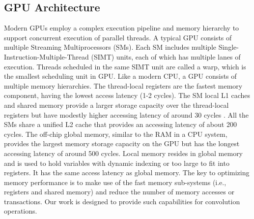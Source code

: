 \subsection{GPU Architecture}
Modern GPUs employ a complex execution pipeline and memory hierarchy to support concurrent execution of parallel threads.
A typical GPU consists of multiple Streaming Multiprocessors (SMs).
Each SM includes multiple Single-Instruction-Multiple-Thread (SIMT) units, each of which has multiple lanes of execution.
Threads scheduled in the same SIMT unit are called a warp, which is the smallest scheduling unit in GPU.
Like a modern CPU, a GPU consists of multiple memory hierarchies.
The thread-local registers are the fastest memory component, having the lowest access latency (1-2 cycles).
The SM local L1 caches and shared memory provide a larger storage capacity over the thread-local registers but have modestly higher accessing latency of around 30 cycles \cite{mei2016dissecting,jia2018dissecting}.
All the SMs share a unified L2 cache that provides an accessing latency of about 200 cycles.
The off-chip global memory, similar to the RAM in a CPU system, provides the largest memory storage capacity on the GPU but has the longest accessing latency of around 500 cycles.
Local memory resides in global memory and is used to hold variables with dynamic indexing or too large to fit into registers.
It has the same access latency as global memory.
The key to optimizing memory performance is to make use of the fast memory sub-systems (i.e., registers and shared memory) and reduce the number of memory accesses or transactions.
Our work is designed to provide such capabilities for convolution operations.
